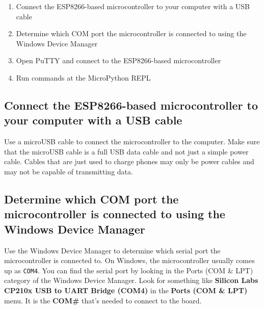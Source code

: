 \documentclass{book}
\providecommand{\tightlist}{%
      \setlength{\itemsep}{0pt}\setlength{\parskip}{0pt}}
\begin{document}
    
        \begin{enumerate}
\def\labelenumi{\arabic{enumi}.}
\tightlist
\item
  Connect the ESP8266-based microcontroller to your computer with a USB
  cable
\item
  Determine which COM port the microcontroller is connected to using the
  Windows Device Manager
\item
  Open PuTTY and connect to the ESP8266-based microcontroller
\item
  Run commands at the MicroPython REPL
\end{enumerate}
    




    
        \subsection{Connect the ESP8266-based microcontroller to your computer
with a USB
cable}\label{connect-the-esp8266-based-microcontroller-to-your-computer-with-a-usb-cable}
    




    
        Use a microUSB cable to connect the microcontroller to the computer.
Make sure that the microUSB cable is a full USB data cable and not just
a simple power cable. Cables that are just used to charge phones may
only be power cables and may not be capable of transmitting data.
    




    
        \subsection{Determine which COM port the microcontroller is connected to
using the Windows Device
Manager}\label{determine-which-com-port-the-microcontroller-is-connected-to-using-the-windows-device-manager}
    




    
        Use the Windows Device Manager to determine which serial port the
microcontroller is connected to. On Windows, the microcontroller usually
comes up as \lstinline!COM4!. You can find the serial port by looking in
the Ports (COM \& LPT) category of the Windows Device Manager. Look for
something like \textbf{Silicon Labs CP210x USB to UART Bridge (COM4)} in
the \textbf{Ports (COM \& LPT)} menu. It is the \textbf{COM\#} that's
needed to connect to the board.
\end{document}
